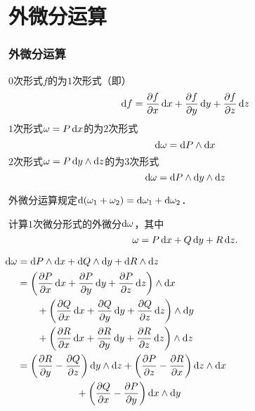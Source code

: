 \documentclass[14pt,notheorems,leqno,xcolor={rgb}]{beamer} %
\begin{document}
\section{外微分运算}

\begin{frame}
\frametitle{外微分运算}
\begin{definition*}
$0$次形式$f$的为$1$次形式（即）
\[ \mathop{}\!\mathrm{d} f=\frac{\partial f}{\partial x}\mathop{}\!\mathrm{d} x+\frac{\partial f}{\partial y}\mathop{}\!\mathrm{d} y+\frac{\partial f}{\partial z}\mathop{}\!\mathrm{d} z \]
$1$次形式$\omega=P\mathop{}\!\mathrm{d} x$的为$2$次形式
\[ \mathop{}\!\mathrm{d}\omega = \mathop{}\!\mathrm{d} P\wedge\mathop{}\!\mathrm{d} x \]
$2$次形式$\omega=P\mathop{}\!\mathrm{d} y\wedge\mathop{}\!\mathrm{d} z$的为$3$次形式
\[ \mathop{}\!\mathrm{d}\omega = \mathop{}\!\mathrm{d} P\wedge\mathop{}\!\mathrm{d} y\wedge\mathop{}\!\mathrm{d} z \]
\end{definition*}
\vpause
\begin{remark*}
外微分运算规定$\mathop{}\!\mathrm{d}(\omega_1+\omega_2)=\mathop{}\!\mathrm{d}\omega_1+\mathop{}\!\mathrm{d}\omega_2$．
\end{remark*}
\end{frame}

\def\totaldiff#1{%
  \frac{\partial #1}{\partial x}\dx
 +\frac{\partial #1}{\partial y}\dy
 +\frac{\partial #1}{\partial z}\dz
}%
\begin{frame}
\begin{example}
计算$1$次微分形式的外微分$\mathop{}\!\mathrm{d}\omega$，其中
\[ \omega = P\mathop{}\!\mathrm{d} x + Q\mathop{}\!\mathrm{d} y + R\mathop{}\!\mathrm{d} z. \]
\end{example}
\vpause\let\displaystyle=\textstyle
\begin{solution}
$\!\!\!\begin{aligned}[t]
\d\omega&=\d P\wedge\dx + \d Q\wedge\dy + \d R\wedge\dz \\
&=\left(\totaldiff{P}\right)\wedge\dx \\
&\qquad+\left(\totaldiff{Q}\right)\wedge\dy \\
&\qquad+\left(\totaldiff{R}\right)\wedge\dz \\
&=\left(\frac{\partial R}{\partial y}-\frac{\partial Q}{\partial z}\right)\dy\wedge\dz
 +\left(\frac{\partial P}{\partial z}-\frac{\partial R}{\partial x}\right)\dz\wedge\dx \\
&\qquad\qquad\qquad+\left(\frac{\partial Q}{\partial x}-\frac{\partial P}{\partial y}\right)\dx\wedge\dy
\end{aligned}$
\end{solution}
\end{frame}
\end{document}
